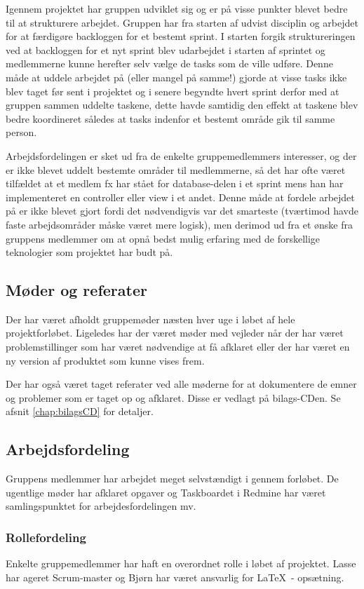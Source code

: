 Igennem projektet har gruppen udviklet sig og er på visse punkter blevet bedre til at strukturere arbejdet. Gruppen har fra starten af udvist disciplin og arbejdet for at færdigøre backloggen for et bestemt sprint. I starten forgik struktureringen ved at backloggen for et nyt sprint blev udarbejdet i starten af sprintet og medlemmerne kunne herefter selv vælge de tasks som de ville udføre. Denne måde at uddele arbejdet på (eller mangel på samme!) gjorde at visse tasks ikke blev taget før sent i projektet og i senere begyndte hvert sprint derfor med at gruppen sammen uddelte taskene, dette havde samtidig den effekt at taskene blev bedre koordineret således at tasks indenfor et bestemt område gik til samme person. 


Arbejdsfordelingen er sket ud fra de enkelte gruppemedlemmers interesser, og der er ikke blevet uddelt bestemte områder til medlemmerne, så det har ofte været tilfældet at et medlem fx har stået for database-delen i et sprint mens han har implementeret en controller eller view i et andet. Denne måde at fordele arbejdet på er ikke blevet gjort fordi det nødvendigvis var det smarteste (tværtimod havde faste arbejdsområder måske været mere logisk), men derimod ud fra et ønske fra gruppens medlemmer om at opnå bedst mulig erfaring med de forskellige teknologier som projektet har budt på.

\subsection{Møder og referater}
Der har været afholdt gruppemøder næsten hver uge i løbet af hele projektforløbet. Ligeledes har der været møder med vejleder når der har været problemstillinger som har været nødvendige at få afklaret eller der har været en ny version af produktet som kunne vises frem.

Der har også været taget referater ved alle møderne for at dokumentere de emner og problemer som er taget op og afklaret. Disse er vedlagt på bilags-CDen. Se afsnit \ref{chap:bilagsCD} for detaljer.

\subsection{Arbejdsfordeling}
Gruppens medlemmer har arbejdet meget selvstændigt i gennem forløbet. De ugentlige møder har afklaret opgaver og Taskboardet i Redmine har været samlingspunktet for arbejdesfordelingen mv.

\subsubsection{Rollefordeling}
Enkelte gruppemedlemmer har haft en overordnet rolle i løbet af projektet.
Lasse har ageret Scrum-master og Bjørn har været ansvarlig for \LaTeX\ - opsætning.